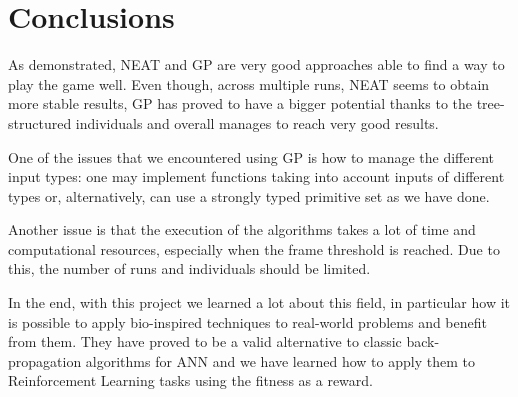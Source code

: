 \section{Conclusions}
As demonstrated, NEAT and GP are very good approaches able to find a way to play the game well. Even
though, across multiple runs, NEAT seems to obtain more stable results, GP has
proved to have a bigger potential thanks to the tree-structured individuals and overall
manages to reach very good results.

One of the issues that we encountered using GP is how to manage the different input types:
one may implement functions taking into account inputs of different types or, alternatively,
can use a strongly typed primitive set as we have done.

Another issue is that the execution of the algorithms takes a lot of time and
computational resources, especially when the frame threshold is reached. Due to this, the
number of runs and individuals should be limited.

In the end, with this project we learned a lot about this field, in particular how it is possible to
apply bio-inspired techniques to real-world problems and benefit from them. They have
proved to be a valid alternative to classic back-propagation algorithms for ANN and we have learned how to
apply them to Reinforcement Learning tasks using the fitness as a reward.
